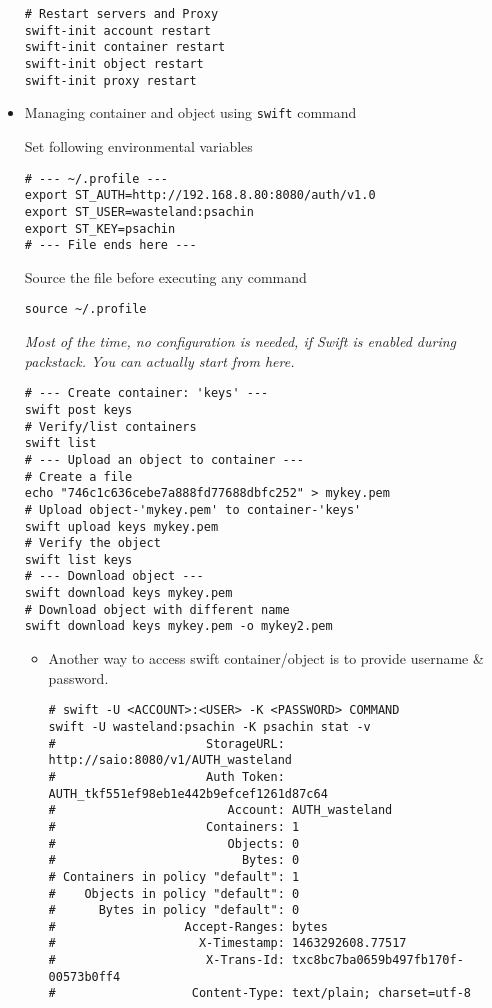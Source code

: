 \documentclass{article}
\begin{document}
\begin{itemize}
\begin{verbatim}
# Restart servers and Proxy
swift-init account restart
swift-init container restart
swift-init object restart
swift-init proxy restart
\end{verbatim}
\item Managing container and object using \texttt{swift} command

Set following environmental variables
\begin{verbatim}
# --- ~/.profile ---
export ST_AUTH=http://192.168.8.80:8080/auth/v1.0
export ST_USER=wasteland:psachin
export ST_KEY=psachin
# --- File ends here ---
\end{verbatim}

Source the file before executing any command
\begin{verbatim}
source ~/.profile
\end{verbatim}

\emph{Most of the time, no configuration is needed, if Swift is
enabled during packstack. You can actually start from here.}
\begin{verbatim}
# --- Create container: 'keys' ---
swift post keys
# Verify/list containers
swift list
# --- Upload an object to container ---
# Create a file
echo "746c1c636cebe7a888fd77688dbfc252" > mykey.pem
# Upload object-'mykey.pem' to container-'keys'
swift upload keys mykey.pem
# Verify the object
swift list keys
# --- Download object ---
swift download keys mykey.pem
# Download object with different name
swift download keys mykey.pem -o mykey2.pem
\end{verbatim}

\begin{itemize}
\item Another way to access swift container/object is to provide
username \& password.
\begin{verbatim}
# swift -U <ACCOUNT>:<USER> -K <PASSWORD> COMMAND
swift -U wasteland:psachin -K psachin stat -v
#                     StorageURL: http://saio:8080/v1/AUTH_wasteland
#                     Auth Token: AUTH_tkf551ef98eb1e442b9efcef1261d87c64
#                        Account: AUTH_wasteland
#                     Containers: 1
#                        Objects: 0
#                          Bytes: 0
# Containers in policy "default": 1
#    Objects in policy "default": 0
#      Bytes in policy "default": 0
#                  Accept-Ranges: bytes
#                    X-Timestamp: 1463292608.77517
#                     X-Trans-Id: txc8bc7ba0659b497fb170f-00573b0ff4
#                   Content-Type: text/plain; charset=utf-8


\end{verbatim}
\end{itemize}
\end{itemize}
\end{document}
